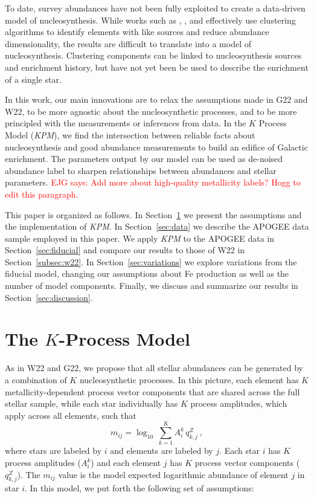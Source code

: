 \documentclass[modern]{aastex631}
\newcommand{\ejg}[1]{\textcolor{red}{EJG says: #1}}
\newcommand{\name}{\textsl{KPM}}
\begin{document}
To date, survey abundances have not been fully exploited to create a data-driven model of nucleosynthesis. While works such as \citet{ting2012}, \citet{casey2019}, and \citet{ratcliffe2022} effectively use clustering algorithms to identify elements with like sources and reduce abundance dimensionality, the results are difficult to translate into a model of nucleosynthesis. Clustering components can be linked to nucleosynthesis sources and enrichment history, but have not yet been be used to describe the enrichment of a single star.

In this work, our main innovations are to relax the assumptions made in G22 and W22, to be more agnostic about the nucleosynthetic processes, and to be more principled with the measurements or inferences from data. In the $K$ Process Model (\name{}), we find the intersection between reliable facts about nucleosynthesis and good abundance measurements to build an edifice of Galactic enrichment. The parameters output by our model can be used as de-noised abundance label to sharpen relationships between abundances and stellar parameters.  \ejg{Add more about high-quality metallicity labels? Hogg to edit this paragraph.} 

This paper is organized as follows. In Section~\ref{sec:model} we present the assumptions and the implementation of \name{}. In Section~\ref{sec:data} we describe the APOGEE data sample employed in this paper.  We apply \name{} to the APOGEE data in Section~\ref{sec:fiducial} and compare our results to those of W22 in Section~\ref{subsec:w22}. In Section~\ref{sec:variations} we explore variations from the fiducial model, changing our assumptions about Fe production as well as the number of model components. Finally, we discuss and summarize our results in Section~\ref{sec:discussion}.

\section{The $K$-Process Model}\label{sec:model}

As in W22 and G22, we propose that all stellar abundances can be generated by a combination of $K$ nucleosynthetic processes.
In this picture, each element has $K$ metallicity-dependent process vector components that are shared across the full stellar sample, while each star individually has $K$ process amplitudes, which apply across all elements, such that
\begin{equation}\label{eq:mij_k}
    m_{ij} = \log_{10} \, \sum^K_{k=1} A_i^k \, q_{k,j}^Z ~,
\end{equation}
where stars are labeled by $i$ and elements are labeled by $j$.
Each star $i$ has $K$ process amplitudes ($A^k_i$)
and each element $j$ has $K$ process vector components ($q_{k,j}^{Z}$).
The $m_{ij}$ value is the model expected logarithmic abundance of element $j$ in star $i$. In this model, we put forth the following set of assumptions:
\end{document}
